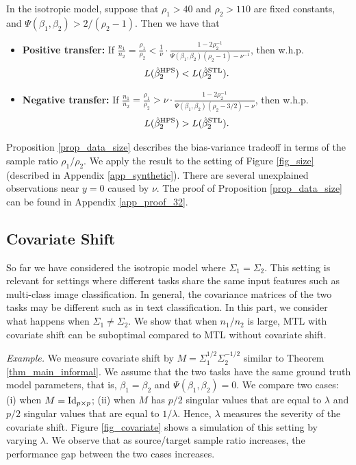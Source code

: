 \begin{proposition}\label{prop_data_size}
	In the isotropic model, suppose that $\rho_1 > 40$ and $\rho_2 > 110$ are fixed constants, and $\Psi(\beta_1, \beta_2) > 2/(\rho_2 - 1)$.
	Then we have that
	\begin{itemize}
		\item \textbf{Positive transfer:} If $\frac{n_1}{n_2} = \frac{\rho_1}{\rho_2} < \frac{1}{\nu} \cdot \frac{1 - 2\rho_2^{-1}}{\Psi(\beta_1, \beta_2) (\rho_2 - 1) - \nu^{-1}}$, then w.h.p. $$L(\hat{\beta}_2^{\textup{HPS}}) < L(\hat{\beta}_2^{\textup{STL}}).$$
		\item \textbf{Negative transfer:} If $\frac{n_1}{n_2} = \frac{\rho_1}{\rho_2} > {\nu} \cdot \frac{1 - 2\rho_2^{-1}}{\Psi(\beta_1, \beta_2) (\rho_2 - 3/2) - \nu}$, then w.h.p. $$L(\hat{\beta}_2^{\textup{HPS}}) > L(\hat{\beta}_2^{\textup{STL}}).$$
	\end{itemize}
\end{proposition}
Proposition \ref{prop_data_size} describes the bias-variance tradeoff in terms of the sample ratio $\rho_1 / \rho_2$.
We apply the result to the setting of Figure \ref{fig_size} (described in Appendix \ref{app_synthetic}).
There are several unexplained observations near $y = 0$ caused by $\nu$.
The proof of Proposition \ref{prop_data_size} can be found in Appendix \ref{app_proof_32}.

\subsection{Covariate Shift} \label{sec_covshift}
So far we have considered the isotropic model where $\Sigma_1 = \Sigma_2$.
This setting is relevant for settings where different tasks share the same input features such as multi-class image classification.
In general, the covariance matrices of the two tasks may be different such as in text classification.
In this part, we consider what happens when $\Sigma_1 \neq \Sigma_2$.
We show that when $n_1 / n_2$ is large, MTL with covariate shift can be suboptimal compared to MTL without covariate shift.

\noindent\textit{Example.}
	We measure covariate shift by $M = \Sigma_1^{1/2} \Sigma_2^{-1/2}$ similar to Theorem \ref{thm_main_informal}.
	We assume that the two tasks have the same ground truth model parameters, that is, $\beta_1 = \beta_2$ and $\Psi(\beta_1, \beta_2) = 0$.
	We compare two cases: (i) when $M = \operatorname{Id}_{p\times p}$; (ii) when $M$ has $p/2$ singular values that are equal to $\lambda$ and $p/2$ singular values that are equal to $1 / \lambda$.
	Hence, $\lambda$ measures the severity of the covariate shift.
	Figure \ref{fig_covariate} shows a simulation of this setting by varying $\lambda$.
	We observe that as source/target sample ratio increases, the performance gap between the two cases increases.

